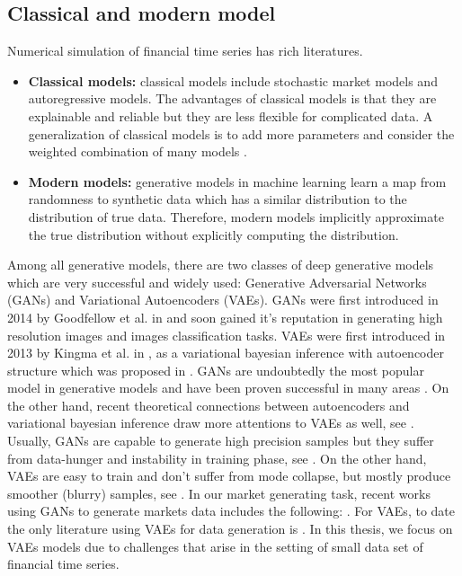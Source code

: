 \documentclass[12pt]{report}
\theoremstyle{definition}
\theoremstyle{remark}
\begin{document}
\subsection{Classical and modern model}
Numerical simulation of financial time series has rich literatures.
\begin{itemize}
  \item \textbf{Classical models:} classical models include stochastic market models and autoregressive models. The advantages of classical models is that they are explainable and reliable but they are less flexible for complicated data. A generalization of classical models is to add more parameters and consider the weighted combination of many models \cite{duembgen2014estimate}. 
  \item \textbf{Modern models:} generative models in machine learning learn a map from randomness to synthetic data which has a similar distribution to the distribution of true data. Therefore, modern models implicitly approximate the true distribution without explicitly computing the distribution. 
\end{itemize}
Among all generative models, there are two classes of deep generative models which are very successful and widely used: Generative Adversarial Networks (GANs) and Variational Autoencoders (VAEs). GANs were first introduced in 2014 by Goodfellow et al. in \cite{mirza2014conditional} and soon gained it's reputation in generating high resolution images and images classification tasks. VAEs were first introduced in 2013 by Kingma et al. in \cite{kingma2013auto}, as a variational bayesian inference with autoencoder structure which was proposed in \cite{ballard1987modular}. GANs are undoubtedly the most popular model in generative models and have been proven successful in many areas . On the other hand, recent theoretical connections between autoencoders and variational bayesian inference draw more attentions to VAEs as well, see \cite{kingma2019introduction}. Usually, GANs are capable to generate high precision samples but they suffer from data-hunger and instability in training phase, see \cite{arjovsky2017towards}. On the other hand, VAEs are easy to train and don’t suffer from mode collapse, but mostly produce smoother (blurry) samples, see \cite{karras2017progressive}. In our market generating task, recent works using GANs to generate markets data includes the following: \cite{bonnier2019deep, cuchiero2020generative, henry2019generative, buehler2019deep, wiese2020quant, xu2020cot}. For VAEs, to date the only literature using VAEs for data generation is \cite{buehler2020data}. In this thesis, we focus on VAEs models due to challenges that arise in the setting of small data set of financial time series.
\end{document}
